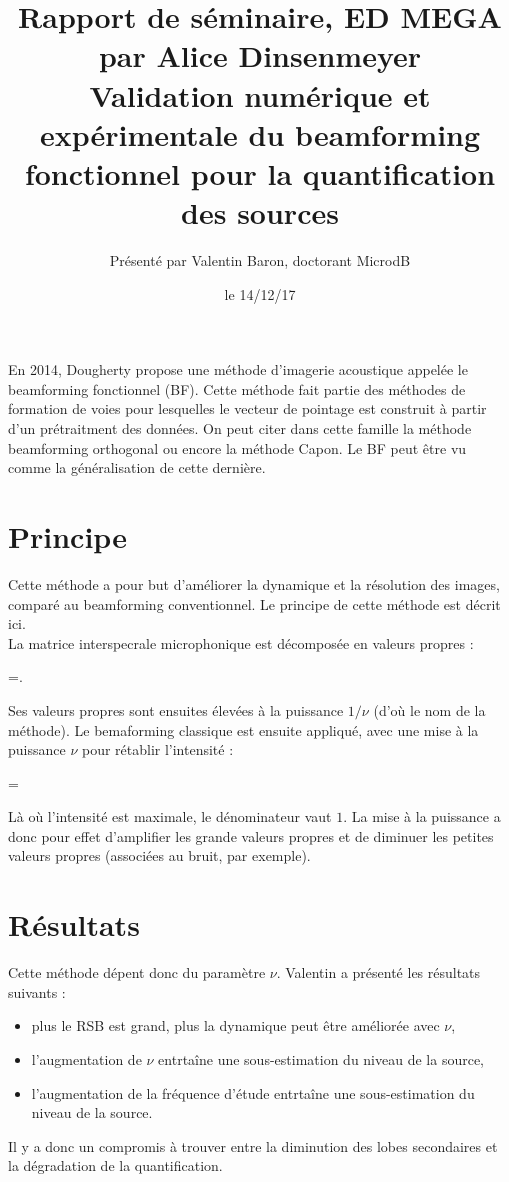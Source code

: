 \documentclass[12pt]{article}
\title{ {\fontsize{14pt}{14pt}\selectfont Rapport de séminaire, ED MEGA par Alice Dinsenmeyer} \\[1cm]
\fontsize{18pt}{18pt}\selectfont\textbf{Validation numérique et expérimentale du beamforming fonctionnel pour la quantification des sources}} %
\author{
\large{Présenté par Valentin Baron, doctorant MicrodB}\\%
\vspace{-5mm}
}
\date{le 14/12/17}
\renewenvironment{equation}{\vspace{-0.2cm}\begin{oldequation}}{\vspace{-0.2cm}\end{oldequation}}
\begin{document}
\maketitle
 En 2014, Dougherty propose une méthode d'imagerie acoustique appelée le beamforming fonctionnel (BF)\cite{doug}. Cette méthode fait partie des méthodes de formation de voies pour lesquelles le vecteur de pointage est construit à partir d'un prétraitment des données. On peut citer dans cette famille la méthode beamforming orthogonal ou encore la méthode Capon. Le BF peut être vu comme la généralisation de cette dernière.
 
\section{Principe}
Cette méthode a pour but d'améliorer la dynamique et la résolution des images, comparé au beamforming conventionnel. Le principe de cette méthode est décrit ici.\\
La matrice interspecrale microphonique est décomposée en valeurs propres :
\begin{equation}
    =.
\end{equation}
Ses valeurs propres sont ensuites élevées à la puissance $1/\nu$ (d'où le nom de la méthode). Le bemaforming classique est ensuite appliqué, avec une mise à la puissance $\nu$ pour rétablir l'intensité : 
\begin{equation}
     = 
\end{equation}
Là où l'intensité est maximale, le dénominateur vaut $1$. La mise à la puissance a donc pour effet d'amplifier les grande valeurs propres et de diminuer les petites valeurs propres (associées au bruit, par exemple).

\section{Résultats}
Cette méthode dépent donc du paramètre $\nu$. Valentin a présenté les résultats suivants : 
\begin{itemize}
    \item plus le RSB est grand, plus la dynamique peut être améliorée avec $\nu$,
    \item l'augmentation de $\nu$ entrtaîne une sous-estimation du niveau de la source,
    \item  l'augmentation de la fréquence d'étude entrtaîne une sous-estimation du niveau de la source.
\end{itemize}
Il y a donc un compromis à trouver entre la diminution des lobes secondaires et la dégradation de la quantification.
\end{document}
